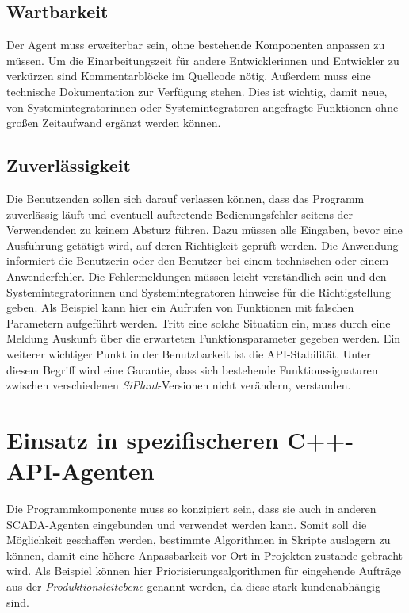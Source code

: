 \subsection{Wartbarkeit}

Der Agent muss erweiterbar sein, ohne bestehende Komponenten anpassen zu müssen. Um die Einarbeitungszeit für andere Entwicklerinnen und Entwickler zu verkürzen sind 
Kommentarblöcke im Quellcode nötig. Außerdem muss eine technische Dokumentation zur Verfügung stehen. Dies ist wichtig, damit neue, von Systemintegratorinnen oder Systemintegratoren angefragte 
Funktionen ohne großen Zeitaufwand ergänzt werden können.

\subsection{Zuverlässigkeit}

Die Benutzenden sollen sich darauf verlassen können, dass das Programm zuverlässig läuft und eventuell auftretende Bedienungsfehler seitens der
Verwendenden zu keinem Absturz führen. Dazu müssen alle Eingaben, bevor eine Ausführung getätigt wird, auf deren Richtigkeit geprüft werden. Die Anwendung informiert die Benutzerin oder den Benutzer bei einem technischen oder einem Anwenderfehler. 
Die Fehlermeldungen müssen leicht verständlich sein und den Systemintegratorinnen und Systemintegratoren hinweise für die Richtigstellung geben. Als Beispiel kann hier ein Aufrufen von Funktionen mit 
falschen Parametern aufgeführt werden. Tritt eine solche Situation ein, muss durch eine Meldung Auskunft über die erwarteten Funktionsparameter gegeben werden.
Ein weiterer wichtiger Punkt in der Benutzbarkeit ist die API-Stabilität. Unter diesem Begriff wird eine Garantie, dass sich bestehende Funktionssignaturen zwischen
verschiedenen \textit{SiPlant}-Versionen nicht verändern, verstanden.

\section{Einsatz in spezifischeren C++-API-Agenten}

Die Programmkomponente muss so konzipiert sein, dass sie auch in anderen SCADA-Agenten eingebunden und verwendet werden kann. 
Somit soll die Möglichkeit geschaffen werden, bestimmte Algorithmen in Skripte auslagern zu können, damit eine höhere 
Anpassbarkeit vor Ort in Projekten zustande gebracht wird. Als Beispiel können hier Priorisierungsalgorithmen für eingehende 
Aufträge aus der \textit{Produktionsleitebene} genannt werden, da diese stark kundenabhängig sind.
